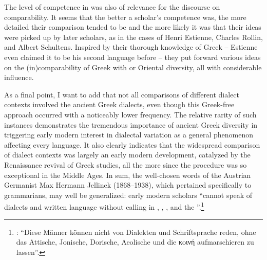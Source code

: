 The level of competence in  was also of relevance for the discourse on comparability. It seems that the better a scholar’s competence was, the more detailed their comparison tended to be and the more likely it was that their ideas were picked up by later scholars, as in the cases of Henri Estienne, Charles Rollin, and Albert Schultens. Inspired by their thorough knowledge of Greek – Estienne even claimed it to be his second language before  – they put forward various ideas on the (in)comparability of Greek with  or Oriental diversity, all with considerable influence.

As a final point, I want to add that not all comparisons of different dialect contexts involved the ancient Greek dialects, even though this Greek-free approach occurred with a noticeably lower frequency. The relative rarity of such instances demonstrates the tremendous importance of ancient Greek diversity in triggering early modern interest in dialectal variation as a general phenomenon affecting every language. It also clearly indicates that the widespread comparison of dialect contexts was largely an early modern development, catalyzed by the Renaissance revival of Greek studies, all the more since the procedure was so exceptional in the Middle Ages. In sum, the well-chosen words of the Austrian Germanist Max Hermann Jellinek (1868–1938), which pertained specifically to  grammarians, may well be generalized: early modern scholars “cannot speak of dialects and written language without calling in , , , and the ”.\footnote{\citet[21]{Jellinek1913}: “Diese Männer können nicht von Dialekten und Schriftsprache reden, ohne das Attische, Jonische, Dorische, Aeolische und die κoινή aufmarschieren zu lassen”.}

